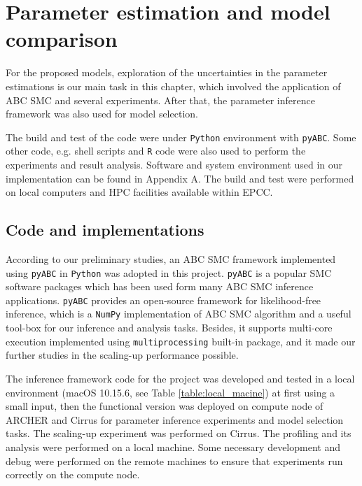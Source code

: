 \chapter{Parameter estimation and model comparison}

For the proposed models, exploration of the uncertainties in the parameter estimations is our main task in this chapter, which involved the application of ABC SMC and several experiments. After that, the parameter inference framework was also used for model selection.

The build and test of the code were under \verb|Python| environment with \verb|pyABC|\cite{ref:pyabc}. Some other code, e.g. shell scripts and \verb|R| code were also used to perform the experiments and result analysis. Software and system environment used in our implementation can be found in Appendix A. The build and test were performed on local computers and HPC facilities available within EPCC.

\section{Code and implementations}




According to our preliminary studies, an ABC SMC framework implemented using \verb|pyABC| in \verb|Python| was adopted in this project. \verb|pyABC| is a popular SMC software packages\cite{ref:pyabc} which has been used form many ABC SMC inference applications\cite{population}. \verb|pyABC| provides an open-source framework for likelihood-free inference, which is a \verb|NumPy| implementation of ABC SMC algorithm and a useful tool-box for our inference and analysis tasks. Besides, it supports multi-core execution implemented using \verb|multiprocessing| built-in package, and it made our further studies in the scaling-up performance possible.

The inference framework code for the project was developed and tested in a local environment (macOS 10.15.6, see Table \ref{table:local_macine}) at first using a small input, then the functional version was deployed on compute node of ARCHER and Cirrus for parameter inference experiments and model selection tasks. The scaling-up experiment was performed on Cirrus. The profiling and its analysis were performed on a local machine. Some necessary development and debug were performed on the remote machines to ensure that experiments run correctly on the compute node.

